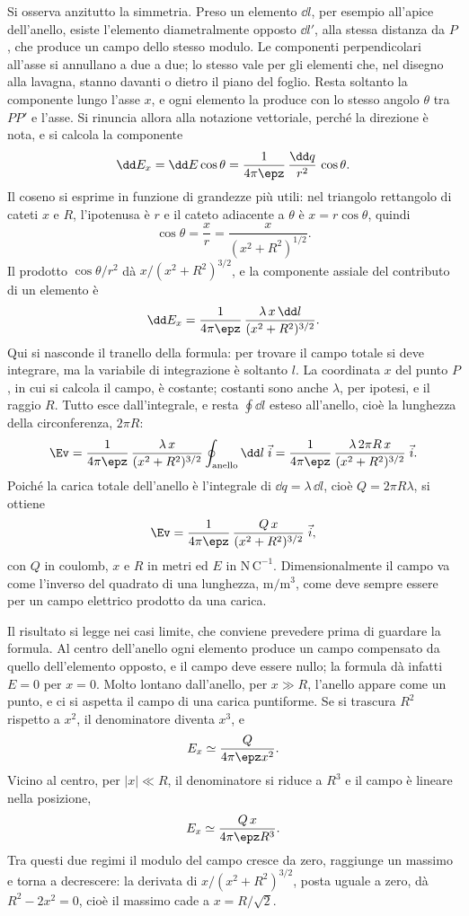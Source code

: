 \documentclass[main.tex]{subfiles}
\begin{document}
Si osserva anzitutto la simmetria. Preso un elemento $\dd l$, per esempio all'apice dell'anello, esiste l'elemento diametralmente opposto $\dd l'$, alla stessa distanza da $P$, che produce un campo dello stesso modulo. Le componenti perpendicolari all'asse si annullano a due a due; lo stesso vale per gli elementi che, nel disegno alla lavagna, stanno davanti o dietro il piano del foglio. Resta soltanto la componente lungo l'asse $x$, e ogni elemento la produce con lo stesso angolo $\theta$ tra $PP'$ e l'asse. Si rinuncia allora alla notazione vettoriale, perché la direzione è nota, e si calcola la componente
\[
\dd E_x=\dd E\cos\theta=\frac{1}{4\pi\epz}\,\frac{\dd q}{r^2}\,\cos\theta .
\]
Il coseno si esprime in funzione di grandezze più utili: nel triangolo rettangolo di cateti $x$ e $R$, l'ipotenusa è $r$ e il cateto adiacente a $\theta$ è $x=r\cos\theta$, quindi
\[
\cos\theta=\frac{x}{r}=\frac{x}{(x^2+R^2)^{1/2}} .
\]
Il prodotto $\cos\theta/r^2$ dà $x/(x^2+R^2)^{3/2}$, e la componente assiale del contributo di un elemento è
\[
\dd E_x=\frac{1}{4\pi\epz}\,\frac{\lambda\,x\,\dd l}{(x^2+R^2)^{3/2}} .
\]
Qui si nasconde il tranello della formula: per trovare il campo totale si deve integrare, ma la variabile di integrazione è soltanto $l$. La coordinata $x$ del punto $P$, in cui si calcola il campo, è costante; costanti sono anche $\lambda$, per ipotesi, e il raggio $R$. Tutto esce dall'integrale, e resta $\oint\dd l$ esteso all'anello, cioè la lunghezza della circonferenza, $2\pi R$:
\[
\Ev=\frac{1}{4\pi\epz}\,\frac{\lambda\,x}{(x^2+R^2)^{3/2}}\oint_{\mathrm{anello}}\dd l\;\vec i=\frac{1}{4\pi\epz}\,\frac{\lambda\,2\pi R\,x}{(x^2+R^2)^{3/2}}\;\vec i .
\]
Poiché la carica totale dell'anello è l'integrale di $\dd q=\lambda\,\dd l$, cioè $Q=2\pi R\lambda$, si ottiene
\[
\Ev=\frac{1}{4\pi\epz}\,\frac{Q\,x}{(x^2+R^2)^{3/2}}\;\vec i ,
\]
con $Q$ in coulomb, $x$ e $R$ in metri ed $E$ in $\mathrm{N\,C^{-1}}$. Dimensionalmente il campo va come l'inverso del quadrato di una lunghezza, $\mathrm{m}/\mathrm{m^3}$, come deve sempre essere per un campo elettrico prodotto da una carica.

Il risultato si legge nei casi limite, che conviene prevedere prima di guardare la formula. Al centro dell'anello ogni elemento produce un campo compensato da quello dell'elemento opposto, e il campo deve essere nullo; la formula dà infatti $E=0$ per $x=0$. Molto lontano dall'anello, per $x\gg R$, l'anello appare come un punto, e ci si aspetta il campo di una carica puntiforme. Se si trascura $R^2$ rispetto a $x^2$, il denominatore diventa $x^3$, e
\[
E_x\simeq\frac{Q}{4\pi\epz x^2} .
\]
Vicino al centro, per $|x|\ll R$, il denominatore si riduce a $R^3$ e il campo è lineare nella posizione,
\[
E_x\simeq\frac{Q\,x}{4\pi\epz R^3} .
\]
Tra questi due regimi il modulo del campo cresce da zero, raggiunge un massimo e torna a decrescere: la derivata di $x/(x^2+R^2)^{3/2}$, posta uguale a zero, dà $R^2-2x^2=0$, cioè il massimo cade a $x=R/\sqrt2$.
\end{document}

